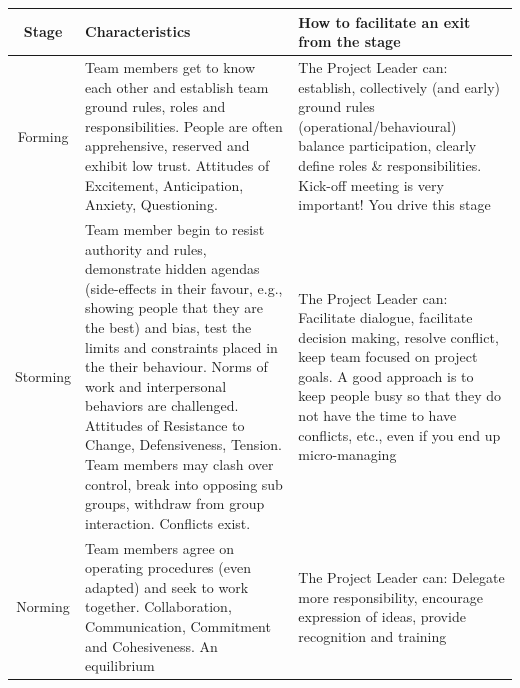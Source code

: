 \documentclass[]{project_plan}
\begin{document}
\begin{tabular}{|c|p{70mm}|p{60mm}|}
  \hline
  Stage      & Characteristics                                                                                                                                                                                                                                                                                                                                                                                                                                                                      & How to facilitate an exit from the stage                                                                                                                                                                                                                               \\
  \hline
  Forming    & Team members get to know each other and establish  team ground rules, roles and responsibilities. People are   often apprehensive, reserved and exhibit low trust.  Attitudes of Excitement, Anticipation, Anxiety,  Questioning.                                                                                                                                                                                                                                                    & The Project Leader can: establish, collectively (and early) ground rules   (operational/behavioural) balance participation, clearly  define roles \& responsibilities. Kick-off meeting is very  important! You drive this stage                                       \\
  \hline
  Storming   & Team member begin to resist authority and rules,  demonstrate hidden agendas (side-effects in their favour,  e.g., showing people that they are the best) and bias,  test the limits and constraints placed in the their  behaviour. Norms of work and interpersonal behaviors are challenged.  Attitudes of Resistance to Change, Defensiveness, Tension. Team  members may clash over control, break into  opposing sub groups, withdraw from group interaction.  Conflicts exist. & The Project Leader can: Facilitate dialogue, facilitate decision making,  resolve conflict, keep team focused on project goals. A good  approach is to keep people busy so that they do not  have the time to have conflicts, etc., even if you end  up micro-managing \\
  \hline
  Norming    & Team members agree on operating procedures (even adapted)  and seek to work together. Collaboration,  Communication, Commitment and Cohesiveness. An equilibrium                                                                                                                                                                                                                                                                                                                     & The Project Leader can: Delegate more responsibility, encourage  expression of ideas, provide recognition and training                                                                                                                                                 \\

\end{tabular}
\end{document}
